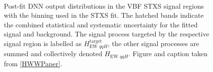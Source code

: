 \begin{figure}[!h]
  \centering
   \\
  \caption{
    Post-fit DNN output distributions in the VBF STXS signal regions with the binning used in the STXS fit.
    The hatched bands indicate the combined statistical and systematic uncertainty for the fitted signal and background.
    The signal process targeted by the respective signal region is labelled as $H_{\text{EW } qqH}^{\mathrm{target}}$, the other signal processes are summed and collectively denoted $H_{\text{EW } qqH}$. 
    Figure and caption taken from \cref{HWWPaper}. 
    \label{fig:aux:VBF-STXS-SRs}
  }
\end{figure}



